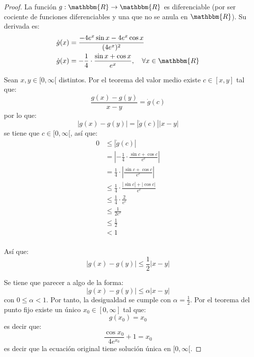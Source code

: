 \documentclass[12pt]{report}
\theoremstyle{largebreak}
\newcommand\abs[1]{\ensuremath{\left|#1\right|}}
\newcommand\cf[3]{\ensuremath{#1:#2\rightarrow#3}}
\newcommand{\bbm}[1]{\ensuremath{\mathbbm{#1}}}
\begin{document}
\begin{proof}
        La función $\cf{g}{\bbm{R}}{\bbm{R}}$ es diferenciable (por ser cociente de funciones diferenciables y una que no se anula en $\bbm{R}$). Su derivada es:
        \begin{equation*}
            \begin{split}
                \dot{g}(x)&=\frac{-4e^x\sin x-4e^x\cos x}{(4e^x)^2}\\
                \dot{g}(x)&=-\frac{1}{4}\cdot\frac{\sin x+\cos x}{e^x},\quad\forall x\in \bbm{R}
            \end{split}
        \end{equation*}

        Sean $x,y\in[0,\infty[$ distintos. Por el teorema del valor medio existe $c\in[x,y]$ tal que:
        \begin{equation*}
            \frac{g(x)-g(y)}{x-y}=\dot{g}(c)
        \end{equation*}
        por lo que:
        \begin{equation*}
            \abs{g(x)-g(y)}=\abs{\dot{g}(c)}\abs{x-y}
        \end{equation*}
        se tiene que $c\in[0,\infty[$, así que:
        \begin{equation*}
            \begin{split}
                0&\leq\abs{\dot{g}(c)}\\
                &=\abs{-\frac{1}{4}\cdot\frac{\sin c+\cos c}{e^c}}\\
                &=\frac{1}{4}\cdot\abs{\frac{\sin c+\cos c}{e^c}}\\
                &\leq\frac{1}{4}\cdot\frac{\abs{\sin c}+\abs{\cos c}}{e^c}\\
                &\leq\frac{1}{4}\cdot\frac{2}{e^c}\\
                &\leq\frac{1}{2e^c}\\
                &\leq\frac{1}{2}\\
                &<1\\
            \end{split}
        \end{equation*}

        Así que:
        \begin{equation*}
            \abs{g(x)-g(y)}\leq\frac{1}{2}\abs{x-y}
        \end{equation*}

        Se tiene que parecer a algo de la forma:
        \begin{equation*}
            \abs{g(x)-g(y)}\leq\alpha\abs{x-y}
        \end{equation*}
        con $0\leq\alpha<1$. Por tanto, la desigualdad se cumple con $\alpha=\frac{1}{2}$. Por el teorema del punto fijo existe un único $x_0\in[0,\infty]$ tal que:
        \begin{equation*}
            g(x_0)=x_0
        \end{equation*}
        es decir que:
        \begin{equation*}
            \frac{\cos x_0}{4e^{x_0}}+1=x_0
        \end{equation*}
        es decir que la ecuación original tiene solución única en $[0,\infty[$.
    \end{proof}
\end{document}
